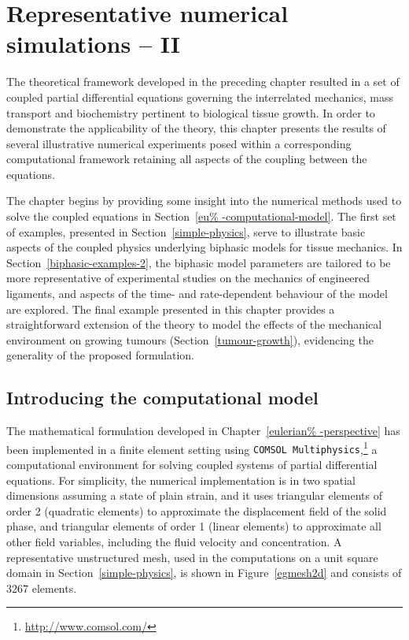 \chapter{Representative numerical simulations -- II}
\label{numerical-simulations-2}

The theoretical framework developed in the preceding chapter resulted
in a set of coupled partial differential equations governing the
interrelated mechanics, mass transport and biochemistry pertinent to
biological tissue growth. In order to demonstrate the applicability of
the theory, this chapter presents the results of several illustrative
numerical experiments posed within a corresponding computational
framework retaining all aspects of the coupling between the equations.

The chapter begins by providing some insight into the numerical
methods used to solve the coupled equations in Section~\ref{eu%
  -computational-model}. The first set of examples, presented in
Section~\ref{simple-physics}, serve to illustrate basic aspects of the
coupled physics underlying biphasic models for tissue mechanics. In
Section~\ref{biphasic-examples-2}, the biphasic model parameters are
tailored to be more representative of experimental studies on the
mechanics of engineered ligaments, and aspects of the time- and
rate-dependent behaviour of the model are explored. The final example
presented in this chapter provides a straightforward extension of the
theory to model the effects of the mechanical environment on growing
tumours (Section~\ref{tumour-growth}), evidencing the generality of
the proposed formulation.

\section{Introducing the computational model}
\label{eu-computational-model}

The mathematical formulation developed in Chapter~\ref{eulerian%
  -perspective} has been implemented in a finite element setting using
{\tt COMSOL Multiphysics},\footnote{\href {http://www.comsol.com/}
  {http://www.comsol.com/}} a computational environment for solving
coupled systems of partial differential equations. For simplicity, the
numerical implementation is in two spatial dimensions assuming a state
of plain strain, and it uses triangular elements of order 2 (quadratic
elements) to approximate the displacement field of the solid phase,
and triangular elements of order 1 (linear elements) to approximate
all other field variables, including the fluid velocity and
concentration. A representative unstructured mesh, used in the
computations on a unit square domain in Section~\ref{simple-physics},
is shown in Figure~\ref{egmesh2d} and consists of 3267 elements.

